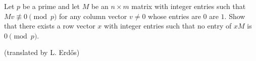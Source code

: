 Let $p$ be a prime and let $M$ be an $n\times m$ matrix with integer entries such that $Mv\not\equiv 0\pmod{p}$ for any column vector $v\neq 0$ whose entries are $0$ are $1$. Show that there exists a row vector $x$ with integer entries such that no entry of $xM$ is $0\pmod{p}$.

(translated by L. Erdős)